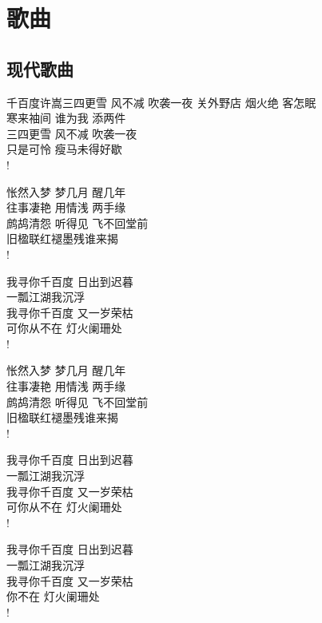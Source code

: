 \part{歌曲}

\chapter{现代歌曲}

\begin{poem}{千百度}{许嵩}{三四更雪 风不减 吹袭一夜}
关外野店 烟火绝 客怎眠\\
寒来袖间 谁为我 添两件\\
三四更雪 风不减 吹袭一夜\\
只是可怜 瘦马未得好歇\\!

怅然入梦 梦几月 醒几年 \\
往事凄艳 用情浅 两手缘 \\
鹧鸪清怨 听得见 飞不回堂前 \\
旧楹联红褪墨残谁来揭 \\!

我寻你千百度 日出到迟暮 \\
一瓢江湖我沉浮 \\
我寻你千百度 又一岁荣枯 \\
可你从不在 灯火阑珊处 \\!

怅然入梦 梦几月 醒几年 \\
往事凄艳 用情浅 两手缘 \\
鹧鸪清怨 听得见 飞不回堂前 \\
旧楹联红褪墨残谁来揭 \\!

我寻你千百度 日出到迟暮 \\
一瓢江湖我沉浮 \\
我寻你千百度 又一岁荣枯 \\
可你从不在 灯火阑珊处 \\!

我寻你千百度 日出到迟暮 \\
一瓢江湖我沉浮 \\
我寻你千百度 又一岁荣枯 \\
你不在 灯火阑珊处 \\!
\end{poem}
